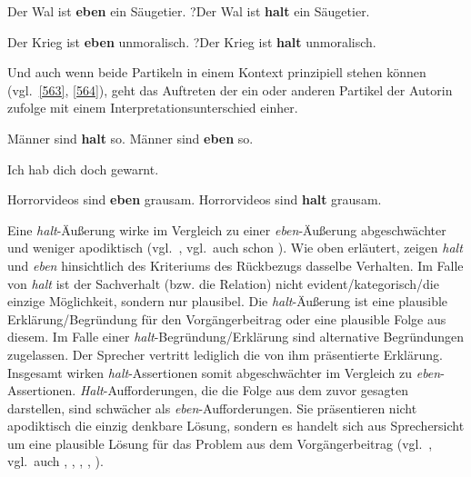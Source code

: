 \begin{exe}
	\ex\label{561} 
		\begin{xlist}	
			\ex\label{561a} Der Wal ist \textbf{eben} ein Säugetier.
			\ex\label{561b} ?Der Wal ist \textbf{halt} ein Säugetier.
		\end{xlist}
\end{exe}
\begin{exe}
	\ex\label{562} 
		\begin{xlist}	
			\ex\label{562a} Der Krieg ist \textbf{eben} unmoralisch.
			\ex\label{562b} ?Der Krieg ist \textbf{halt} unmoralisch.
			\hfill\hbox{\citet[124]{Thurmair1989}}
		\end{xlist}
\end{exe}
Und auch wenn beide Partikeln in einem Kontext prinzipiell stehen können (vgl.\ \ref{563}, \ref{564}), geht das Auftreten der ein oder anderen Partikel der Autorin zufolge mit einem Interpretationsunterschied einher.

\begin{exe}
	\ex\label{563} 
		\begin{xlist}	
			\ex\label{563b} Männer sind \textbf{halt} so.
			\ex\label{563a} Männer sind \textbf{eben} so.
		\end{xlist}
\end{exe}
\begin{exe}
	\ex\label{564} Ich hab dich doch gewarnt. 
		\begin{xlist}	
			\ex\label{564a} Horrorvideos sind \textbf{eben} grausam.	
			\ex\label{564b} Horrorvideos sind \textbf{halt} grausam.
			\hfill\hbox{\citet[124]{Thurmair1989}}
		\end{xlist}
\end{exe}
Eine \textit{halt}-Äußerung wirke im Vergleich zu einer \textit{eben}-Äußerung abgeschwächter und weniger apodiktisch (vgl.\ \citealt[125]{Thurmair1989}, vgl.\ auch schon \citealt[309]{Schlieben-Lange1979}). Wie oben erläutert, zeigen \textit{halt} und \textit{eben} hinsichtlich des Kriteriums des Rückbezugs dasselbe Verhalten. Im Falle von \textit{halt} ist der Sachverhalt (bzw. die Relation) nicht evident/kategorisch/die einzige Möglichkeit, sondern nur plausibel. Die \textit{halt}-Äußerung ist eine plausible Erklärung/Begründung für den Vorgängerbeitrag oder eine plausible Folge aus diesem. Im Falle einer \textit{halt}-Begründung/Erklärung sind alternative Begründungen zugelassen. Der Sprecher vertritt lediglich die von ihm präsentierte Erklärung. Insgesamt wirken \textit{halt}-As\-sertionen somit abgeschwächter im Vergleich zu \textit{eben}-Assertionen. \textit{Halt}-Auffor\-derungen, die die Folge  aus dem zuvor gesagten darstellen, sind schwächer als \textit{eben}-Aufforde\-rungen. Sie präsentieren nicht apodiktisch die einzig denkbare Lösung, sondern es handelt sich aus Sprechersicht um eine plausible Lösung für das Problem aus dem Vorgängerbeitrag (vgl.\ \citealt[125--126]{Thurmair1989}, vgl.\ auch \citealt[316]{Schlieben-Lange1979}, \citealt[74--75]{Hartog1982}, \citealt[235]{Meibauer1994}, \citealt[312]{Rost-Roth1998}, \citealt[98]{Autenrieth2002}).

